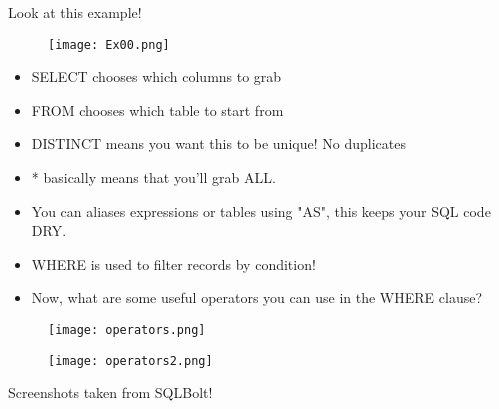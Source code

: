 \documentclass{42-en}
\begin{document}
	Look at this example! \\
    
            \begin{figure}[H]
                \begin{center}
                    \texttt{[image: Ex00.png]}
                \end{center}
            \end{figure}

	\begin{itemize}\itemsep1pt 
		\item SELECT chooses which columns to grab 
		\item FROM chooses which table to start from
		\item DISTINCT means you want this to be unique! No duplicates 
		\item * basically means that  you'll grab ALL. 
		\item You can aliases expressions or tables using "AS", this keeps your SQL code DRY. 
		\item WHERE is used to filter records by condition! 
		\item Now, what are some useful operators you can use in the WHERE clause?  
	\end{itemize}

    
            \begin{figure}[H]
                \begin{center}
                    \texttt{[image: operators.png]}
                \end{center}
            \end{figure}

    
            \begin{figure}[H]
                \begin{center}
                    \texttt{[image: operators2.png]}
                \end{center}
            \end{figure}

	Screenshots taken from SQLBolt! 
	


\nextexercice

\end{document}
